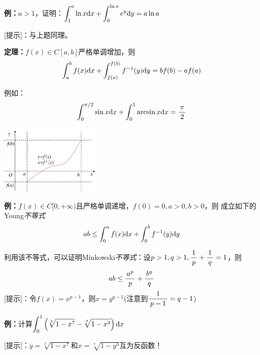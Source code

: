 {\bf 例：}$a>1$，证明：$\displaystyle\int_1^a\ln x\mathrm{d} x+\displaystyle\int_0^{\ln a}e^y\mathrm{d} y=a\ln a$

[提示]：与上题同理。

\begin{thx}
	{\bf 定理：}$f(x)\in C[a,b]$严格单调增加，则
	$$\displaystyle\int_a^bf(x)\mathrm{d} x+\displaystyle\int_{f(a)}^{f(b)}f^{-1}(y)\mathrm{d} y=bf(b)-af(a)$$
\end{thx}

例如：
$$\displaystyle\int_0^{\pi/2}\sin x\mathrm{d} x+\displaystyle\int_0^1\arcsin x\mathrm{d} x=\displaystyle\frac{\,{\pi}\,}{\,{2}\,}$$
\begin{center}
	\includegraphics[width=5cm]{./images/ch6/iff-1ab.pdf}  
\end{center}

{\bf 例：}$f(x)\in C[0,+\infty)$且严格单调递增，$f(0)=0,a>0,b>0$，则
成立如下的Young{\it 不等式}
$$ab\leq\displaystyle\int_0^af(x)\mathrm{d} x+\displaystyle\int_0^bf^{-1}(y)\mathrm{d} y$$
\begin{center}
\end{center}
利用该不等式，可以证明Minkowski{\it 不等式}：设$p>1,q>1,\displaystyle\frac{\,{1}\,}{\,{p}\,}+\displaystyle\frac{\,{1}\,}{\,{q}\,}=1$，则
$$ab\leq\displaystyle\frac{\,{a^p}\,}{\,{p}\,}+\displaystyle\frac{\,{b^q}\,}{\,{q}\,}$$
[提示]：令$f(x)=x^{p-1}$，则$x=y^{q-1}$(注意到$\displaystyle\frac{\,{1}\,}{\,{p-1}\,}=q-1$)

{\bf 例：}计算$\displaystyle\int_0^1\left(\sqrt[3]{1-x^7}-\sqrt[7]{1-x^3}\right)\mathrm{d} x$

[提示]：$y=\sqrt[3]{1-x^7}$和$x=\sqrt[7]{1-y^3}$互为反函数！

